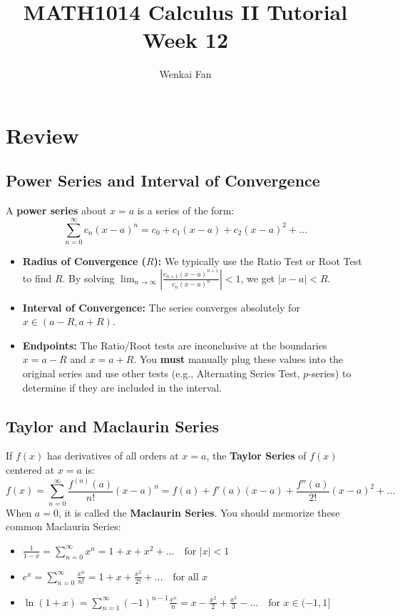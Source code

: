 \documentclass[11pt]{article}
\title{\vspace{-1.0em}MATH1014 Calculus II Tutorial\\Week 12}
\author{Wenkai Fan}
\date{}
\theoremstyle{definition}
\begin{document}
\maketitle
\thispagestyle{fancy}

\section{Review}

\subsection{Power Series and Interval of Convergence}
A \textbf{power series} about $x = a$ is a series of the form:
\[ \sum_{n=0}^{\infty} c_n (x-a)^n = c_0 + c_1(x-a) + c_2(x-a)^2 + \dots \]
\begin{itemize}
    \item \textbf{Radius of Convergence ($R$):} We typically use the Ratio Test or Root Test to find $R$.
    By solving $\lim_{n \to \infty} \left| \frac{c_{n+1}(x-a)^{n+1}}{c_n(x-a)^n} \right| < 1$, we get $|x-a| < R$.
    \item \textbf{Interval of Convergence:} The series converges absolutely for $x \in (a-R, a+R)$.
    \item \textbf{Endpoints:} The Ratio/Root tests are inconclusive at the boundaries $x = a-R$ and $x = a+R$. You \textbf{must} manually plug these values into the original series and use other tests (e.g., Alternating Series Test, $p$-series) to determine if they are included in the interval.
\end{itemize}

\subsection{Taylor and Maclaurin Series}
If $f(x)$ has derivatives of all orders at $x=a$, the \textbf{Taylor Series} of $f(x)$ centered at $x=a$ is:
\[ f(x) = \sum_{n=0}^{\infty} \frac{f^{(n)}(a)}{n!} (x-a)^n = f(a) + f'(a)(x-a) + \frac{f''(a)}{2!}(x-a)^2 + \dots \]
When $a=0$, it is called the \textbf{Maclaurin Series}. You should memorize these common Maclaurin Series:
\begin{itemize}
    \item $\displaystyle \frac{1}{1-x} = \sum_{n=0}^{\infty} x^n = 1 + x + x^2 + \dots \quad \text{for } |x| < 1$
    \item $\displaystyle e^x = \sum_{n=0}^{\infty} \frac{x^n}{n!} = 1 + x + \frac{x^2}{2!} + \dots \quad \text{for all } x$
    \item $\displaystyle \ln(1+x) = \sum_{n=1}^{\infty} (-1)^{n-1} \frac{x^n}{n} = x - \frac{x^2}{2} + \frac{x^3}{3} - \dots \quad \text{for } x \in (-1, 1]$
\end{itemize}
\end{document}
